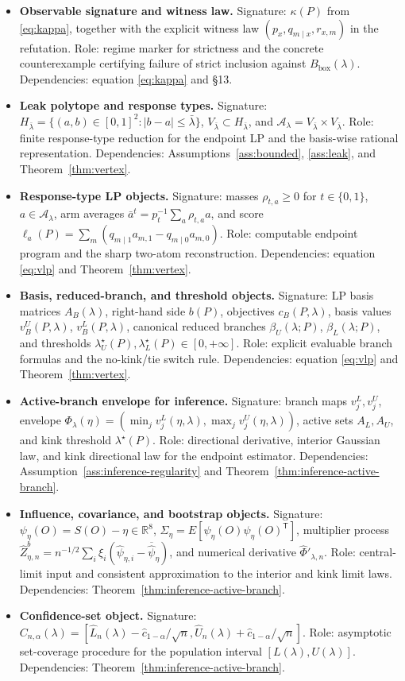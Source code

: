\documentclass[11pt]{article}
\newcommand{\transpose}{\mathsf{T}}
\theoremstyle{definition}
\theoremstyle{plain}
\theoremstyle{remark}
\begin{document}
\begin{itemize}
  \item \textbf{Observable signature and witness law.} Signature: \(\kappa(P)\) from \eqref{eq:kappa}, together with the explicit witness law \((p_x,q_{m\mid x},r_{x,m})\) in the refutation. Role: regime marker for strictness and the concrete counterexample certifying failure of strict inclusion against \(B_{\mathrm{box}}(\lambda)\). Dependencies: equation \eqref{eq:kappa} and \S13.
  \item \textbf{Leak polytope and response types.} Signature: \(H_{\bar\lambda}=\{(a,b)\in[0,1]^2:|b-a|\le\bar\lambda\}\), \(V_{\bar\lambda}\subset H_{\bar\lambda}\), and \(\mathcal A_\lambda=V_{\bar\lambda}\times V_{\bar\lambda}\). Role: finite response-type reduction for the endpoint LP and the basis-wise rational representation. Dependencies: Assumptions~\ref{ass:bounded}, \ref{ass:leak}, and Theorem~\ref{thm:vertex}.
  \item \textbf{Response-type LP objects.} Signature: masses \(\rho_{t,a}\ge0\) for \(t\in\{0,1\}\), \(a\in\mathcal A_\lambda\), arm averages \(\bar a^t=p_t^{-1}\sum_a\rho_{t,a}a\), and score \(\ell_a(P)=\sum_m(q_{m\mid1}a_{m,1}-q_{m\mid0}a_{m,0})\). Role: computable endpoint program and the sharp two-atom reconstruction. Dependencies: equation \eqref{eq:vlp} and Theorem~\ref{thm:vertex}.
  \item \textbf{Basis, reduced-branch, and threshold objects.} Signature: LP basis matrices \(A_B(\lambda)\), right-hand side \(b(P)\), objectives \(c_B(P,\lambda)\), basis values \(v_B^U(P,\lambda)\), \(v_B^L(P,\lambda)\), canonical reduced branches \(\beta_U(\lambda;P)\), \(\beta_L(\lambda;P)\), and thresholds \(\lambda_U^\star(P),\lambda_L^\star(P)\in[0,+\infty]\). Role: explicit evaluable branch formulas and the no-kink/tie switch rule. Dependencies: equation \eqref{eq:vlp} and Theorem~\ref{thm:vertex}.
  \item \textbf{Active-branch envelope for inference.} Signature: branch maps \(v_j^L,v_j^U\), envelope \(\Phi_\lambda(\eta)=(\min_j v_j^L(\eta,\lambda),\max_j v_j^U(\eta,\lambda))\), active sets \(A_L,A_U\), and kink threshold \(\lambda^\star(P)\). Role: directional derivative, interior Gaussian law, and kink directional law for the endpoint estimator. Dependencies: Assumption~\ref{ass:inference-regularity} and Theorem~\ref{thm:inference-active-branch}.
  \item \textbf{Influence, covariance, and bootstrap objects.} Signature: \(\psi_\eta(O)=S(O)-\eta\in\mathbb R^8\), \(\Sigma_\eta=E[\psi_\eta(O)\psi_\eta(O)^\transpose]\), multiplier process \(\widehat Z_{\eta,n}^b=n^{-1/2}\sum_i\xi_i(\widehat\psi_{\eta,i}-\overline{\widehat\psi}_\eta)\), and numerical derivative \(\widehat\Phi'_{\lambda,n}\). Role: central-limit input and consistent approximation to the interior and kink limit laws. Dependencies: Theorem~\ref{thm:inference-active-branch}.
  \item \textbf{Confidence-set object.} Signature: \(C_{n,\alpha}(\lambda)=[\widehat L_n(\lambda)-\widehat c_{1-\alpha}/\sqrt n,\widehat U_n(\lambda)+\widehat c_{1-\alpha}/\sqrt n]\). Role: asymptotic set-coverage procedure for the population interval \([L(\lambda),U(\lambda)]\). Dependencies: Theorem~\ref{thm:inference-active-branch}.
\end{itemize}
\end{document}
